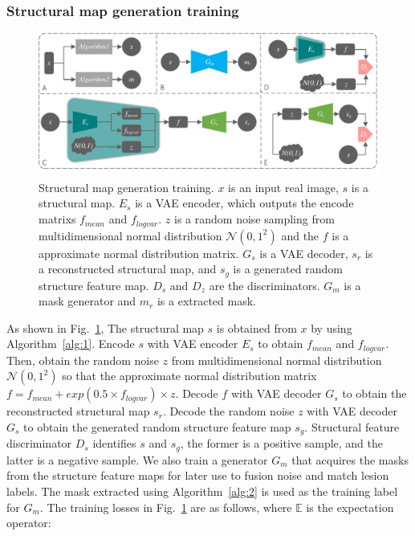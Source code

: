 \documentclass[runningheads]{llncs}
\begin{document}
\subsubsection{Structural map generation training}
\begin{figure}
	\centering
	\includegraphics[width=0.98\columnwidth]{figures/feature_train}
	\caption{Structural map generation training. $x$ is an input real image, $s$ is a structural map. $E_s$ is a VAE encoder, which outputs the encode matrixs $f_{mean}$ and $f_{logvar}$. $z$ is a random noise sampling from multidimensional normal distribution $\mathcal{N}(0,1^2)$ and the $f$ is a approximate normal distribution matrix. $G_s$ is a VAE decoder, $s_r$ is a reconstructed structural map, and $s_g$ is a generated random structure feature map. $D_{s}$ and $D_{z}$ are the discriminators. $G_m$ is a mask generator and $m_r$ is a extracted mask. }
	\label{feature_train}
\end{figure}
As shown in Fig.~\ref{feature_train}, The structural map $s$ is obtained from $x$ by using Algorithm~\ref{alg:1}. Encode $s$ with VAE encoder $E_s$ to obtain $f_{mean}$ and $f_{logvar}$. Then, obtain the random noise $z$ from multidimensional normal distribution $\mathcal{N}(0,1^2)$ so that the approximate normal distribution matrix  $f=f_{mean}+exp(0.5\times f_{logvar})\times z$. Decode $f$ with VAE decoder $G_s$ to obtain the reconstructed structural map $s_r$. Decode the random noise $z$ with VAE decoder $G_s$ to obtain the generated random structure feature map $s_g$. Structural feature discriminator $D_{s}$ identifies $s$ and $s_g$, the former is a positive sample, and the latter is a negative sample. We also train a generator $G_m$ that acquires the masks from the structure feature maps for later use to fusion noise and match lesion labels. The mask extracted using Algorithm~\ref{alg:2} is used as the training label for $G_m$. The training losses in Fig.~\ref{feature_train} are as follows, where $\mathbb{E}$ is the expectation operator: 
\end{document}
